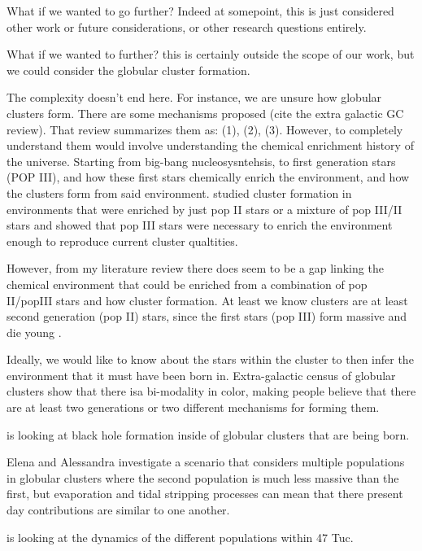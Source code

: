         What if we wanted to go further? Indeed at somepoint, this is just considered other work or future considerations, or other research questions entirely. 

        What if we wanted to further? this is certainly outside the scope of our work, but we could consider the globular cluster formation. 

        The complexity doesn't end here. For instance, we are unsure how globular clusters form. There are some mechanisms proposed (cite the extra galactic GC review). That review summarizes them as: (1), (2), (3). However, to completely understand them would involve understanding the chemical enrichment history of the universe. Starting from big-bang nucleosysntehsis, to first generation stars (POP III), and how these first stars chemically enrich the environment, and how the clusters form from said environment. \citet{2022A&A...668A.191C} studied cluster formation in environments that were enriched by just pop II stars or a mixture of pop III/II stars and showed that pop III stars were necessary to enrich the environment enough to reproduce current cluster qualtities. 

        However, from my literature review there does seem to be a gap linking the chemical environment that could be enriched from a combination of pop II/popIII stars and how cluster formation. At least we know clusters are at least second generation (pop II) stars, since the first stars (pop III) form massive and die young \citep{2002ApJ...571...30S}.

        Ideally, we would like to know about the stars within the cluster to then infer the environment that it must have been born in. Extra-galactic census of globular clusters show that there isa bi-modality in color, making people believe that there are at least two generations or two different mechanisms for forming them. 

        \citet{2025arXiv250507491V} is looking at black hole formation inside of globular clusters that are being born. 

        \citet{2024A&A...681A..45L} Elena and Alessandra investigate a scenario that considers multiple populations in globular clusters where the second population is much less massive than the first, but evaporation and tidal stripping processes can mean that there present day contributions are similar to one another. 

        \citet{2025MNRAS.537.2342C} is looking at the dynamics of the different populations within 47 Tuc.

